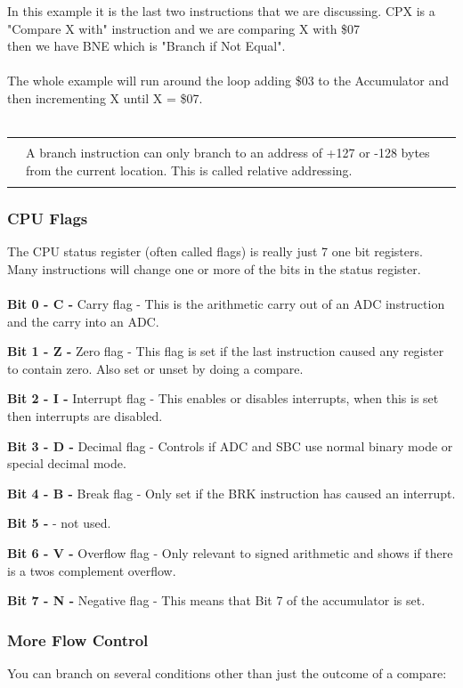 \documentclass{ol-softwaremanual}
\newcommand{\Note}[1]{
\begin{table}[h]
\begin{tabular}{|p{0.1\textwidth}p{0.8\textwidth}|}
\hline
 & \\
\multicolumn{1}{|r}{\Huge\warning} & #1\\
 &  \\ \hline
\end{tabular}
\end{table}
}
\begin{document}
In this example it is the last two instructions that we are discussing. CPX is a "Compare X with" instruction and we are comparing X with \$07\\
then we have BNE which is "Branch if Not Equal".\\
\\
The whole example will run around the loop adding \$03 to the Accumulator and then incrementing X until X = \$07.\\
\\
\Note{A branch instruction can only branch to an address of +127 or -128 bytes from the current location. This is called relative addressing.}
\pagebreak

\subsubsection{CPU Flags}
The CPU status register (often called flags) is really just 7 one bit registers. Many instructions will change one or more of the bits in the status register.\\
\\
\textbf{Bit 0 - C -} Carry flag - This is the arithmetic carry out of an ADC instruction and the carry into an ADC.

\textbf{Bit 1 - Z -} Zero flag - This flag is set if the last instruction caused any register to contain zero. Also set or unset by doing a compare.

\textbf{Bit 2 - I -} Interrupt flag - This enables or disables interrupts, when this is set then interrupts are disabled.

\textbf{Bit 3 - D -} Decimal flag - Controls if ADC and SBC use normal binary mode or special decimal mode. 

\textbf{Bit 4 - B -} Break flag - Only set if the BRK instruction has caused an interrupt.

\textbf{Bit 5 - } - not used.

\textbf{Bit 6 - V -} Overflow flag -  Only relevant to signed arithmetic and shows if there is a twos complement overflow.

\textbf{Bit 7 - N -} Negative flag - This means that Bit 7 of the accumulator is set.




\subsubsection{More Flow Control}
You can branch on several conditions other than just the outcome of a compare:\\
\end{document}
